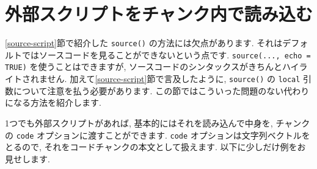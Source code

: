 \documentclass[
  11pt,
  lualatex,
  ja=standard]{bxjsreport}
\begin{document}
\hypertarget{option-code}{%
\section{外部スクリプトをチャンク内で読み込む}\label{option-code}}

\ref{source-script}節で紹介した \texttt{source()} の方法には欠点があります. それはデフォルトではソースコードを見ることができないという点です. \texttt{source(..., echo = TRUE)} を使うことはできますが, ソースコードのシンタックスがきちんとハイライトされません. 加えて\ref{source-script}節で言及したように, \texttt{source()} の \texttt{local} 引数について注意を払う必要があります. この節ではこういった問題のない代わりになる方法を紹介します.

1つでも外部スクリプトがあれば, 基本的にはそれを読み込んで中身を, チャンクの \texttt{code} オプションに渡すことができます. \texttt{code} オプションは文字列ベクトルをとるので, それをコードチャンクの本文として扱えます. 以下に少しだけ例をお見せします.
\end{document}
